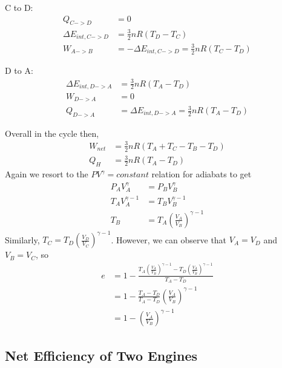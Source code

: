 \documentclass{article}
\begin{document}
\begin{itemize}
	C to D:
	\begin{align*}
	Q_{C->D} &= 0 \\
	\Delta E_{int,C->D} &= \frac{3}{2}nR(T_D-T_C) \\
	W_{A->B} &= -\Delta E_{int,C->D} = \frac{3}{2}nR(T_C-T_D)
	\end{align*}
	
	D to A:
	\begin{align*}
	\Delta E_{int,D->A} &= \frac{3}{2}nR(T_A-T_D) \\
	W_{D->A} &= 0 \\
	Q_{D->A} &= \Delta E_{int,D->A} = \frac{3}{2}nR(T_A-T_D)
	\end{align*}
	
	Overall in the cycle then,
	\begin{align*}
	W_{net} &= \frac{3}{2}nR(T_A + T_C - T_B - T_D) \\
	Q_{H} &= \frac{3}{2}nR(T_A-T_D)
	\end{align*}
	Again we resort to the $PV^{\gamma} = constant$ relation for adiabats to get
	\begin{align*}
	P_AV_A^{\gamma} &= P_BV_B^{\gamma} \\
	T_AV_A^{\gamma-1} &= T_BV_B^{\gamma-1} \\
	T_B &= T_A\left(\frac{V_A}{V_B}\right)^{\gamma-1}
	\end{align*}
	Similarly, $T_C = T_D\left(\frac{V_D}{V_C}\right)^{\gamma-1}$. However, we can observe that $V_A = V_D$ and $V_B = V_C$, so
	\begin{align*}
	e &= 1-\frac{T_A\left(\frac{V_A}{V_B}\right)^{\gamma-1}-T_D\left(\frac{V_A}{V_B}\right)^{\gamma-1}}{T_A-T_D} \\
	&= 1-\frac{T_A-T_D}{T_A-T_D}\left(\frac{V_A}{V_B}\right)^{\gamma-1} \\
	&= 1-\left(\frac{V_A}{V_B}\right)^{\gamma-1}
	\end{align*}
\end{itemize}

\subsection{Net Efficiency of Two Engines}
\end{document}
